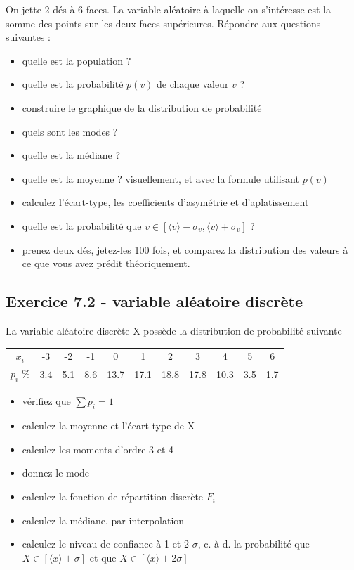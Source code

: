 On jette 2 dés à 6 faces. La variable aléatoire à laquelle on s'intéresse est la somme des points sur les deux faces supérieures. Répondre aux questions suivantes :
\begin{itemize}
    \item quelle est la population ?
    \item quelle est la probabilité $p(v)$ de chaque valeur $v$ ?
    \item construire le graphique de la distribution de probabilité
    \item quels sont les modes ?
    \item quelle est la médiane ?
    \item quelle est la moyenne ? visuellement, et avec la formule utilisant $p(v)$
    \item calculez l'écart-type, les coefficients d'asymétrie et d'aplatissement
    \item quelle est la probabilité que $v\in[\langle v \rangle-\sigma_v,\langle v \rangle+\sigma_v]$ ?
    \item prenez deux dés, jetez-les 100 fois, et comparez la distribution des valeurs à ce que vous avez prédit théoriquement.
\end{itemize}

\subsection*{Exercice 7.2 - variable aléatoire discrète}

La variable aléatoire discrète X possède la distribution de probabilité suivante
\begin{center}
    \begin{tabular}{c|cccccccccc}
        $x_i$    & -3  & -2  & -1  & 0    & 1    & 2    & 3    & 4    & 5   & 6   \\
        $p_i$ \% & 3.4 & 5.1 & 8.6 & 13.7 & 17.1 & 18.8 & 17.8 & 10.3 & 3.5 & 1.7
    \end{tabular}
\end{center}
\begin{itemize}
    \item vérifiez que $\sum p_i=1$
    \item calculez la moyenne et l'écart-type de X
    \item calculez les moments d'ordre 3 et 4
    \item donnez le mode
    \item calculez la fonction de répartition discrète $F_i$
    \item calculez la médiane, par interpolation
    \item calculez le niveau de confiance à 1 et 2 $\sigma$, c.-à-d. la probabilité que $X\in[\langle x\rangle\pm\sigma]$ et que $X\in[\langle x\rangle\pm2\sigma]$
\end{itemize}

